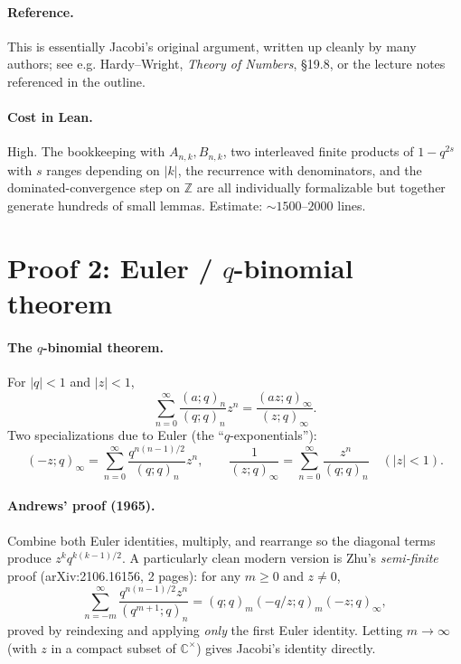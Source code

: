 \paragraph{Reference.} This is essentially Jacobi's original argument, written up cleanly by many authors; see e.g. Hardy--Wright, \emph{Theory of Numbers}, \S 19.8, or the lecture notes referenced in the outline.

\paragraph{Cost in Lean.} High. The bookkeeping with $A_{n,k}, B_{n,k}$, two interleaved finite products of $1 - q^{2s}$ with $s$ ranges depending on $|k|$, the recurrence with denominators, and the dominated-convergence step on $\mathbb{Z}$ are all individually formalizable but together generate hundreds of small lemmas. Estimate: $\sim 1500$--$2000$ lines.

\section{Proof 2: Euler / $q$-binomial theorem}
\label{sec:qbin}

\paragraph{The $q$-binomial theorem.} For $|q| < 1$ and $|z| < 1$,
\[
\sum_{n=0}^\infty \frac{(a; q)_n}{(q; q)_n} z^n = \frac{(az; q)_\infty}{(z; q)_\infty}.
\]
Two specializations due to Euler (the ``$q$-exponentials''):
\[
(-z; q)_\infty = \sum_{n=0}^\infty \frac{q^{n(n-1)/2}}{(q; q)_n} z^n, \qquad
\frac{1}{(z; q)_\infty} = \sum_{n=0}^\infty \frac{z^n}{(q; q)_n} \quad (|z| < 1).
\]

\paragraph{Andrews' proof (1965).} Combine both Euler identities, multiply, and rearrange so the diagonal terms produce $z^k q^{k(k-1)/2}$. A particularly clean modern version is Zhu's \emph{semi-finite} proof (arXiv:2106.16156, 2 pages): for any $m \geq 0$ and $z \neq 0$,
\[
\sum_{n=-m}^\infty \frac{q^{n(n-1)/2} z^n}{(q^{m+1}; q)_n} = (q; q)_m (-q/z; q)_m (-z; q)_\infty,
\]
proved by reindexing and applying \emph{only} the first Euler identity. Letting $m \to \infty$ (with $z$ in a compact subset of $\mathbb{C}^\times$) gives Jacobi's identity directly.

